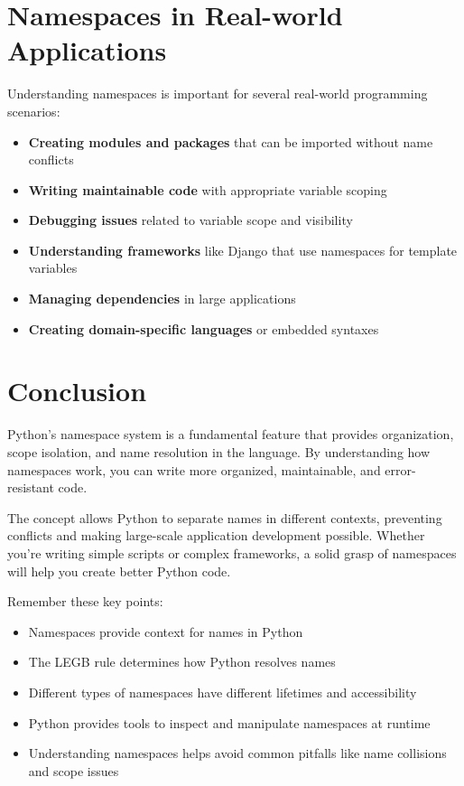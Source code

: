 \documentclass[12pt,letterpaper]{article}
\begin{document}
\section{Namespaces in Real-world Applications}

Understanding namespaces is important for several real-world programming scenarios:

\begin{itemize}
    \item \textbf{Creating modules and packages} that can be imported without name conflicts
    \item \textbf{Writing maintainable code} with appropriate variable scoping
    \item \textbf{Debugging issues} related to variable scope and visibility
    \item \textbf{Understanding frameworks} like Django that use namespaces for template variables
    \item \textbf{Managing dependencies} in large applications
    \item \textbf{Creating domain-specific languages} or embedded syntaxes
\end{itemize}

\section{Conclusion}

Python's namespace system is a fundamental feature that provides organization, scope isolation, and name resolution in the language. By understanding how namespaces work, you can write more organized, maintainable, and error-resistant code.

The concept allows Python to separate names in different contexts, preventing conflicts and making large-scale application development possible. Whether you're writing simple scripts or complex frameworks, a solid grasp of namespaces will help you create better Python code.

Remember these key points:
\begin{itemize}
    \item Namespaces provide context for names in Python
    \item The LEGB rule determines how Python resolves names
    \item Different types of namespaces have different lifetimes and accessibility
    \item Python provides tools to inspect and manipulate namespaces at runtime
    \item Understanding namespaces helps avoid common pitfalls like name collisions and scope issues
\end{itemize}
\end{document}

